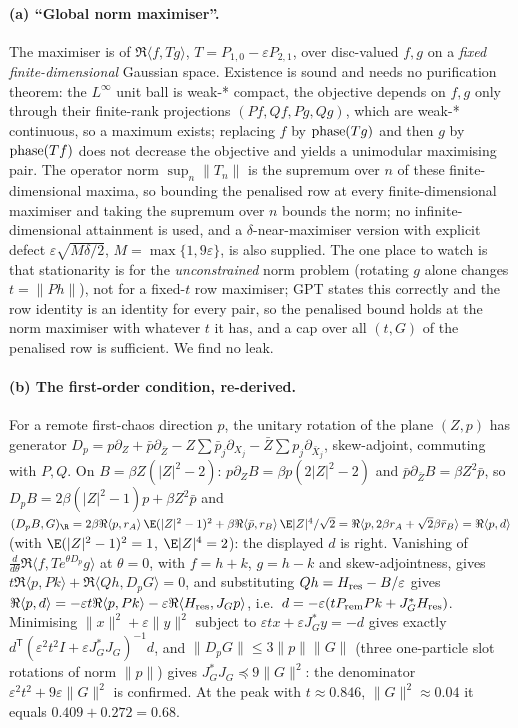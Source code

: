 \paragraph{(a) ``Global norm maximiser''.} The maximiser is of $\Re\langle f,Tg\rangle$, $T=P_{1,0}-\varepsilon P_{2,1}$, over disc-valued $f,g$ on a \emph{fixed finite-dimensional} Gaussian space.
Existence is sound and needs no purification theorem: the $L^\infty$ unit ball is weak-* compact, the objective depends on $f,g$ only through their finite-rank projections $(Pf,Qf,Pg,Qg)$,
which are weak-* continuous, so a maximum exists; replacing $f$ by $\operatorname{phase}(Tg)$ and then $g$ by $\operatorname{phase}(Tf)$ does not decrease the objective and yields a unimodular maximising pair. The operator norm
$\sup_n\|T_n\|$ is the supremum over $n$ of these finite-dimensional maxima, so bounding the penalised row at every finite-dimensional maximiser and taking the supremum over $n$ bounds the norm;
no infinite-dimensional attainment is used, and a $\delta$-near-maximiser version with explicit defect $\varepsilon\sqrt{M\delta/2}$, $M=\max\{1,9\varepsilon\}$, is also supplied. The one place to
watch is that stationarity is for the \emph{unconstrained} norm problem (rotating $g$ alone changes $t=\|Ph\|$), not for a fixed-$t$ row maximiser; GPT states this correctly and the row identity is
an identity for every pair, so the penalised bound holds at the norm maximiser with whatever $t$ it has, and a cap over all $(t,G)$ of the penalised row is sufficient. We find no leak.
\paragraph{(b) The first-order condition, re-derived.} For a remote first-chaos direction $p$, the unitary rotation of the plane $(Z,p)$ has generator
$D_p=p\partial_Z+\bar p\partial_{\bar Z}-Z\sum\bar p_j\partial_{X_j}-\bar Z\sum p_j\partial_{\bar X_j}$, skew-adjoint, commuting with $P,Q$. On $B=\beta Z(|Z|^2-2)$: $p\partial_ZB=\beta p(2|Z|^2-2)$ and
$\bar p\partial_{\bar Z}B=\beta Z^2\bar p$, so $D_pB=2\beta(|Z|^2-1)p+\beta Z^2\bar p$ and $(D_pB,G)_{\R}=2\beta\Re\langle p,r_A\rangle\,\E(|Z|^2-1)^2+\beta\Re\langle\bar p,r_B\rangle\,\E|Z|^4/\sqrt2
=\Re\langle p,2\beta r_A+\sqrt2\beta\bar r_B\rangle=\Re\langle p,d\rangle$ (with $\E(|Z|^2-1)^2=1$, $\E|Z|^4=2$): the displayed $d$ is right. Vanishing of $\frac d{d\theta}\Re\langle f,Te^{\theta D_p}g\rangle$ at
$\theta=0$, with $f=h+k$, $g=h-k$ and skew-adjointness, gives $t\Re\langle p,Pk\rangle+\Re\langle Qh,D_pG\rangle=0$, and substituting $Qh=H_{\rm res}-B/\varepsilon$ gives
$\Re\langle p,d\rangle=-\varepsilon t\Re\langle p,Pk\rangle-\varepsilon\Re\langle H_{\rm res},J_Gp\rangle$, i.e.\ $d=-\varepsilon(tP_{\rm rem}Pk+J_G^*H_{\rm res})$. Minimising $\|x\|^2+\varepsilon\|y\|^2$ subject to
$\varepsilon tx+\varepsilon J_G^*y=-d$ gives exactly $d^{\mathsf T}(\varepsilon^2t^2I+\varepsilon J_G^*J_G)^{-1}d$, and $\|D_pG\|\le3\|p\|\|G\|$ (three one-particle slot rotations of norm $\|p\|$) gives
$J_G^*J_G\preceq9\|G\|^2$: the denominator $\varepsilon^2t^2+9\varepsilon\|G\|^2$ is confirmed. At the peak with $t\approx0.846$, $\|G\|^2\approx0.04$ it equals $0.409+0.272=0.68$.
